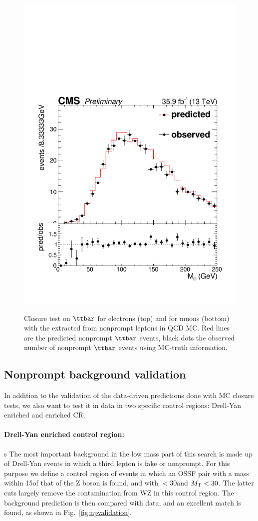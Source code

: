 \begin{figure}[h]
{\includegraphics[width=.43\textwidth]{Figures/c5/FAKE/mu_closuresMlll.pdf}}
\caption{Closure test on $\ttbar$ for electrons (top) and for muons
  (bottom) with the \fr extracted from nonprompt leptons in QCD MC. Red lines are the predicted nonprompt $\ttbar$ events, black dots the observed number of nonprompt $\ttbar$ events using MC-truth information.}
\label{fig:closures2_ele}
\end{figure}


\subsection{Nonprompt background validation}
In addition to the validation of the data-driven predictions done with MC closure tests, we also want
to test it in data in two specific control regions: Drell-Yan
enriched and \ttbar enriched CR.
\paragraph{Drell-Yan enriched
  control region:}s
The most important background in the low mass part of this search is
made up of Drell-Yan events in which a third lepton is fake or
nonprompt. For this purpose we define a control region of events in
which an OSSF pair with a mass within 15\GeV of that of the Z boson is
found, and with \ptmiss $< 30$\GeV and $M_{\mathrm{T}} < 30$\GeV . The latter
cuts largely remove the contamination from WZ in this control
region. The background prediction is then compared with data, and an excellent match is found, as shown in Fig.~\ref{fig:npvalidation}. 

